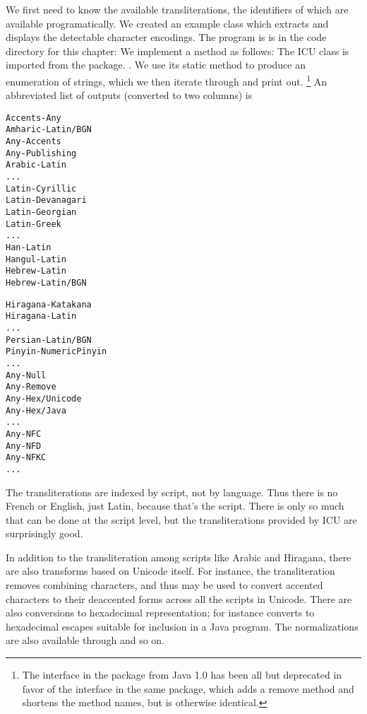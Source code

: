 We first need to know the available transliterations, the identifiers
of which are available programatically.  
We created an example class  which extracts and
displays the detectable character encodings.
The program is is in the code directory for this chapter:
%
%
We implement a  method as follows:
%
%
The ICU  class is imported from the package.
.  We use its static method 
to produce an enumeration of strings, which we then iterate through
and print out.%
%
\footnote{The  interface in the package  
from Java 1.0 has been all but deprecated in favor of the
 interface in the same package, which adds a remove
method and shortens the method names, but is otherwise identical.}
%
An abbreviated list of outputs (converted to two columns) is
%
\begin{trivlist}
\item
\begin{minipage}[t]{0.45\textwidth}
\begin{verbatim}
Accents-Any
Amharic-Latin/BGN
Any-Accents
Any-Publishing
Arabic-Latin
...
Latin-Cyrillic
Latin-Devanagari
Latin-Georgian
Latin-Greek
...
Han-Latin
Hangul-Latin
Hebrew-Latin
Hebrew-Latin/BGN
\end{verbatim}
\end{minipage}%
\begin{minipage}[t]{0.45\textwidth}
\begin{verbatim}
Hiragana-Katakana
Hiragana-Latin
...
Persian-Latin/BGN
Pinyin-NumericPinyin
...
Any-Null
Any-Remove
Any-Hex/Unicode
Any-Hex/Java
...
Any-NFC
Any-NFD
Any-NFKC
...
\end{verbatim}
\end{minipage}
\end{trivlist}
%
The transliterations are indexed by script, not by language.  Thus
there is no French or English, just Latin, because that's the script.
There is only so much that can be done at the script level, but the
transliterations provided by ICU are surprisingly good.  

In addition to the transliteration among scripts like Arabic and
Hiragana, there are also transforms based on Unicode itself.  For
instance, the  transliteration removes combining
characters, and thus may be used to convert accented characters to
their deaccented forms across all the scripts in Unicode.  There
are also conversions to hexadecimal representation; for instance
 converts to hexadecimal  escapes
suitable for inclusion in a Java program.  The normalizations are
also available through  and so on. 


